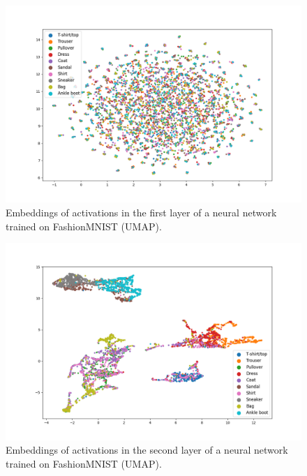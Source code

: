 \documentclass{article}
\begin{document}
\begin{figure}
  \centering
    \includegraphics[width=1.0\textwidth]{../../out/activations_cnn/fmnist/umap/trained/plot_l1_f0.png}
    \caption{Embeddings of activations in the first layer of a neural network trained on FashionMNIST (UMAP).}
\end{figure}

\begin{figure}
  \centering
    \includegraphics[width=1.0\textwidth]{../../out/activations_cnn/fmnist/umap/trained/plot_l2_f0.png}
    \caption{Embeddings of activations in the second layer of a neural network trained on FashionMNIST (UMAP).}
\end{figure}
\end{document}
